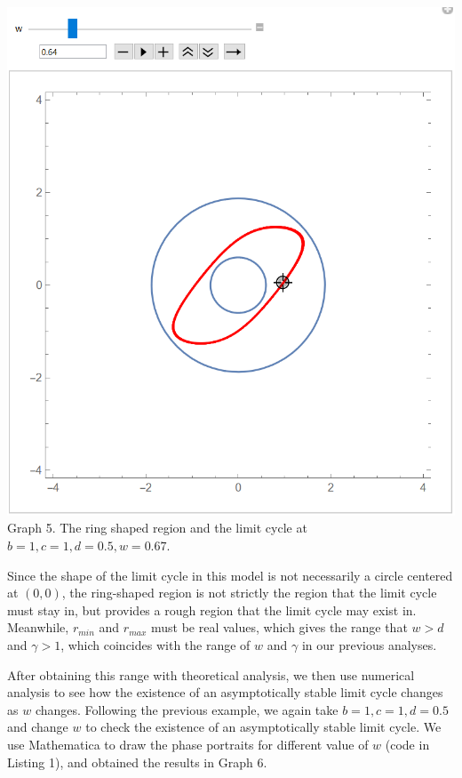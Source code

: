 \documentclass[12pt]{article}
\begin{document}
\begin{center}
\includegraphics[scale=0.38]{ RminRmax01.png}\\
\footnotesize{Graph 5. The ring shaped region and the limit cycle at $b=1,c=1,d=0.5,w=0.67$.}
\end{center}

Since the shape of the limit cycle in this model is not  necessarily a circle centered at $(0,0)$, the ring-shaped region is not strictly the region that the limit cycle must stay in, but provides a rough region that the limit cycle may exist in. Meanwhile, $r_{min}$ and $r_{max}$ must be real values, which gives the range that $w>d$ and $\gamma>1$, which coincides with the range of $w$ and $\gamma$ in our previous analyses.

After obtaining this range with theoretical analysis, we then use numerical analysis to see how the existence of an asymptotically stable limit cycle changes as $w$ changes. Following the previous example, we again take $b=1,c=1,d=0.5$ and change $w$ to check the existence of an asymptotically stable limit cycle. We use Mathematica to draw the phase portraits for different value of $w$ (code in Listing 1), and obtained the results in Graph 6.
\end{document}
